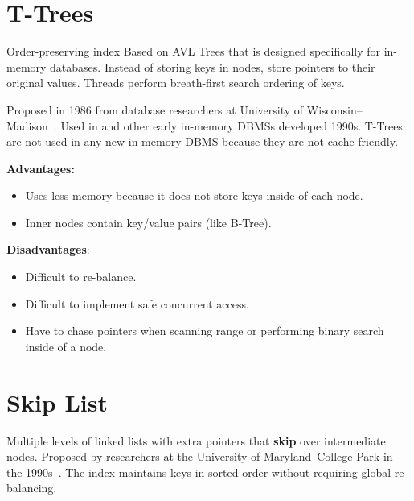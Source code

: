 \documentclass[11pt]{article}
\begin{document}
\maketitle
\thispagestyle{plain}

\section{T-Trees}
Order-preserving index Based on AVL Trees that is designed specifically for in-memory databases. 
Instead of storing keys in nodes, store pointers to their original 
values. Threads perform breath-first search ordering of keys.

Proposed in 1986 from database researchers at University of Wisconsin--Madison~\cite{P294}.
Used in  and other early in-memory DBMSs developed 1990s. T-Trees are not used in 
any new in-memory DBMS because they are not cache friendly.


\textbf{Advantages:}
\begin{itemize}
    \item
    Uses less memory because it does not store keys inside of each node.
    
    \item
    Inner nodes contain key/value pairs (like B-Tree).
\end{itemize}

\textbf{Disadvantages}:
\begin{itemize}
    \item
    Difficult to re-balance.
    
    \item
    Difficult to implement safe concurrent access.
    
    \item
    Have to chase pointers when scanning range or performing binary search inside of a node.
\end{itemize}

\section{Skip List}
Multiple levels of linked lists with extra pointers that \textbf{skip} over intermediate nodes. 
Proposed by researchers at the University of Maryland--College Park in the 1990s~\cite{p668-pugh}.
The index maintains keys in sorted order without requiring global re-balancing.
\end{document}
